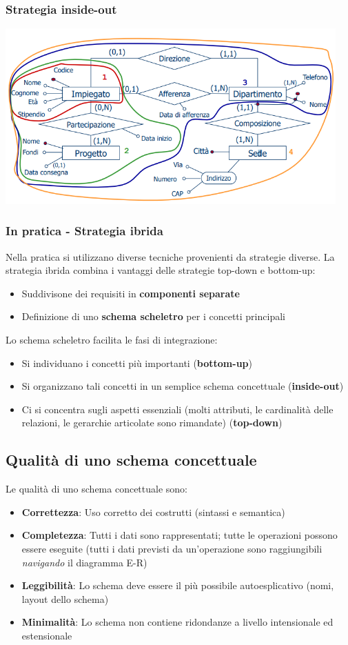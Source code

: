 \documentclass[12pt]{article}
\begin{document}
\subsubsection{Strategia inside-out}
\begin{center}
    \includegraphics[width = 0.95\textwidth]{Images/71.PNG}
\end{center}
\subsubsection{In pratica - Strategia ibrida}
Nella pratica si utilizzano diverse tecniche provenienti da strategie diverse.
La strategia ibrida combina i vantaggi delle strategie top-down e bottom-up:
\begin{itemize}
    \item Suddivisone dei requisiti in \textbf{componenti separate}
    \item Definizione di uno \textbf{schema scheletro} per i concetti principali
\end{itemize}
Lo schema scheletro facilita le fasi di integrazione:
\begin{itemize}
    \item Si individuano i concetti più importanti (\textbf{bottom-up})
    \item Si organizzano tali concetti in un semplice schema concettuale (\textbf{inside-out})
    \item Ci si concentra sugli aspetti essenziali (molti attributi, le cardinalità delle relazioni, le gerarchie articolate sono rimandate) (\textbf{top-down})
\end{itemize}
\subsection{Qualità di uno schema concettuale}
Le qualità di uno schema concettuale sono:
\begin{itemize}
    \item \textbf{Correttezza}: Uso corretto dei costrutti (sintassi e semantica)
    \item \textbf{Completezza}: Tutti i dati sono rappresentati; tutte le operazioni possono essere eseguite (tutti i dati previsti da un'operazione sono raggiungibili \textit{navigando} il diagramma E-R)
    \item \textbf{Leggibilità}: Lo schema deve essere il più possibile autoesplicativo (nomi, layout dello schema)
    \item \textbf{Minimalità}: Lo schema non contiene ridondanze a livello intensionale ed estensionale
\end{itemize}
\end{document}
